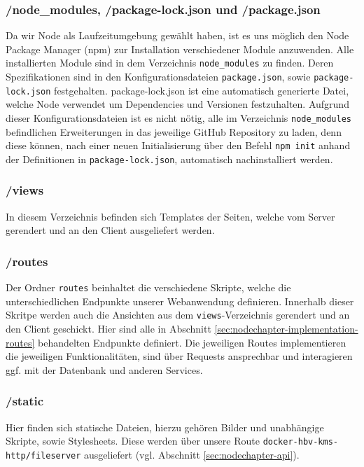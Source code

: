 \subsubsection*{/node\_modules, /package-lock.json und /package.json}
Da wir Node als Laufzeitumgebung gewählt haben, ist es uns möglich den Node Package Manager (npm) zur Installation
verschiedener Module anzuwenden. Alle installierten Module sind in dem Verzeichnis \verb|node_modules| zu finden.
Deren Spezifikationen sind in den Konfigurationsdateien \verb|package.json|, sowie \verb|package-lock.json| festgehalten.
package-lock.json ist eine automatisch generierte Datei, welche Node verwendet um Dependencies und Versionen festzuhalten.
Aufgrund dieser Konfigurationsdateien ist es nicht nötig, alle im Verzeichnis \verb|node_modules| befindlichen Erweiterungen
in das jeweilige GitHub Repository zu laden, denn diese können, nach einer neuen Initialisierung über den Befehl \verb|npm init|
anhand der Definitionen in \verb|package-lock.json|, automatisch nachinstalliert werden.

\subsubsection*{/views}
In diesem Verzeichnis befinden sich Templates der Seiten, welche vom Server gerendert und an den Client ausgeliefert werden.

\subsubsection*{/routes}
Der Ordner \verb|routes| beinhaltet die verschiedene Skripte, welche die unterschiedlichen Endpunkte unserer Webanwendung definieren.
Innerhalb dieser Skritpe werden auch die Ansichten aus dem \verb|views|-Verzeichnis gerendert und an den Client geschickt. Hier sind alle
in Abschnitt \ref{sec:nodechapter-implementation-routes} behandelten Endpunkte definiert. Die jeweiligen Routes
implementieren die jeweiligen Funktionalitäten, sind über Requests ansprechbar und interagieren ggf. mit der Datenbank
und anderen Services.

\subsubsection*{/static}
Hier finden sich statische Dateien, hierzu gehören Bilder und unabhängige Skripte, sowie Stylesheets. Diese werden
über unsere Route \verb|docker-hbv-kms-http/fileserver| ausgeliefert (vgl. Abschnitt \ref{sec:nodechapter-api}).

